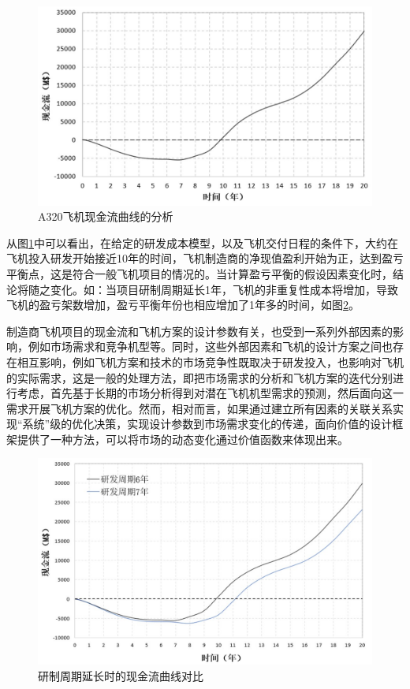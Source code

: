 \documentclass[12pt,a4paper]{report}
\begin{document}
\begin{figure}[!htp]
  \centering
  \includegraphics[width=.8\textwidth]{eps/cashflow.jpg}
  \caption{A320飞机现金流曲线的分析}
 \label{fig:cashflow}
\end{figure}

从图\ref{fig:cashflow}中可以看出，在给定的研发成本模型，以及飞机交付日程的条件下，大约在飞机投入研发开始接近10年的时间，飞机制造商的净现值盈利开始为正，达到盈亏平衡点，这是符合一般飞机项目的情况的。当计算盈亏平衡的假设因素变化时，结论将随之变化。如：当项目研制周期延长1年，飞机的非重复性成本将增加，导致飞机的盈亏架数增加，盈亏平衡年份也相应增加了1年多的时间，如图\ref{fig:cashflow2}。

制造商飞机项目的现金流和飞机方案的设计参数有关，也受到一系列外部因素的影响，例如市场需求和竞争机型等。同时，这些外部因素和飞机的设计方案之间也存在相互影响，例如飞机方案和技术的市场竞争性既取决于研发投入，也影响对飞机的实际需求，这是一般的处理方法，即把市场需求的分析和飞机方案的迭代分别进行考虑，首先基于长期的市场分析得到对潜在飞机机型需求的预测，然后面向这一需求开展飞机方案的优化。然而，相对而言，如果通过建立所有因素的关联关系实现“系统”级的优化决策，实现设计参数到市场需求变化的传递，面向价值的设计框架提供了一种方法，可以将市场的动态变化通过价值函数来体现出来。

\begin{figure}[!htp]
  \centering
  \includegraphics[width=.8\textwidth]{eps/cashflow2.jpg}
  \caption{研制周期延长时的现金流曲线对比}
 \label{fig:cashflow2}
\end{figure}
\end{document}

